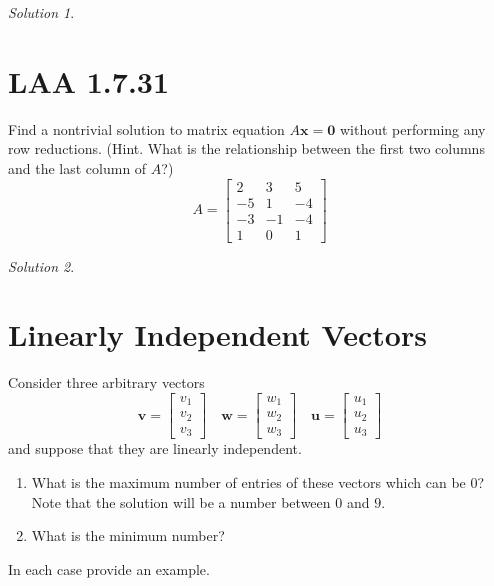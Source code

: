 \documentclass{article}
\theoremstyle{remark}
\newtheorem*{solution}{Solution}
\begin{document}
\medskip

\begin{solution}
\end{solution}

\pagebreak
\section{LAA 1.7.31}
Find a nontrivial solution to matrix equation $A \mathbf x = \mathbf 0$ without performing any row reductions. (Hint. What is the relationship between the first two columns and the last column of $A$?)
\begin{displaymath}
  A =
  \begin{bmatrix}
    2 & 3 & 5 \\
    -5 & 1 & -4 \\
    -3 & -1 & -4 \\
    1 & 0 & 1
  \end{bmatrix}
\end{displaymath}

\medskip

\begin{solution}
\end{solution}

\pagebreak
\section{Linearly Independent Vectors}
Consider three arbitrary vectors
\begin{displaymath}
  \mathbf v =
  \begin{bmatrix}
    v_1 \\ v_2 \\ v_3
  \end{bmatrix}
  \quad
  \mathbf w =
  \begin{bmatrix}
    w_1 \\ w_2 \\ w_3
  \end{bmatrix}
  \quad
  \mathbf u =
  \begin{bmatrix}
    u_1 \\ u_2 \\ u_3
  \end{bmatrix}
\end{displaymath}
and suppose that they are linearly independent.
\begin{enumerate}
\item What is the maximum number of entries of these vectors which can be $0$? Note that the solution will be a number between $0$ and $9$.
\item What is the minimum number?
\end{enumerate}
In each case provide an example.
\end{document}
